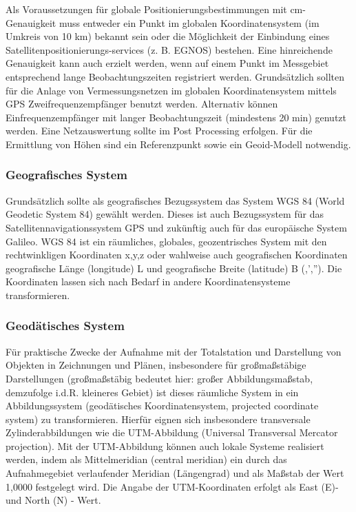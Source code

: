 Als Voraussetzungen für globale Positionierungsbestimmungen mit cm-Genauigkeit muss entweder ein Punkt im globalen Koordinatensystem (im Umkreis von 10 km) bekannt sein oder die Möglichkeit der Einbindung eines Satellitenpositionierungs-services (z. B. EGNOS) bestehen. Eine hinreichende Genauigkeit kann auch erzielt werden, wenn auf einem Punkt im Messgebiet entsprechend lange Beobachtungszeiten registriert werden. Grundsätzlich sollten für die Anlage von Vermessungsnetzen im globalen Koordinatensystem mittels GPS Zweifrequenzempfänger benutzt werden. Alternativ können Einfrequenzempfänger mit langer Beobachtungszeit (mindestens 20 min) genutzt werden. Eine Netzauswertung sollte im Post Processing erfolgen. Für die Ermittlung von Höhen sind ein Referenzpunkt sowie ein Geoid-Modell notwendig.

\subsubsection*{Geografisches System}
Grundsätzlich sollte als geografisches Bezugssystem das System WGS 84 (World Geodetic System 84) gewählt werden. Dieses ist auch Bezugssystem für das Satellitennavigationssystem GPS und zukünftig auch für das europäische System Galileo. WGS 84 ist ein räumliches, globales, geozentrisches System mit den rechtwinkligen Koordinaten x,y,z oder wahlweise auch geografischen Koordinaten geografische Länge (longitude) L und geografische Breite (latitude) B (\textdegree,',''). Die Koordinaten lassen sich nach Bedarf in andere Koordinatensysteme transformieren.

\subsubsection*{Geodätisches System}
Für praktische Zwecke der Aufnahme mit der Totalstation und Darstellung von Objekten in Zeichnungen und Plänen, insbesondere für großmaßstäbige Darstellungen (großmaßstäbig bedeutet hier: großer Abbildungsmaßstab, demzufolge i.d.R. kleineres Gebiet) ist dieses räumliche System in ein Abbildungssystem (geodätisches Koordinatensystem, projected coordinate system) zu transformieren. Hierfür eignen sich insbesondere transversale Zylinderabbildungen wie die UTM-Abbildung (Universal Transversal Mercator projection). Mit der UTM-Abbildung können auch lokale Systeme realisiert werden, indem als Mittelmeridian (central meridian) ein durch das Aufnahmegebiet verlaufender Meridian (Längengrad) und als Maßstab der Wert 1,0000 festgelegt wird. Die Angabe der UTM-Koordinaten erfolgt als East (E)- und North (N) - Wert.

